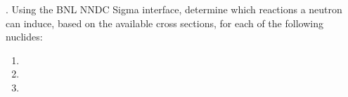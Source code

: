 
.  Using the BNL NNDC Sigma interface, determine which
reactions a neutron can induce, based on the available cross sections, for
each of the following nuclides:
\begin{enumerate}[label=(\alph*)]
\item {}
\item {}
\item {}
\end{enumerate}

